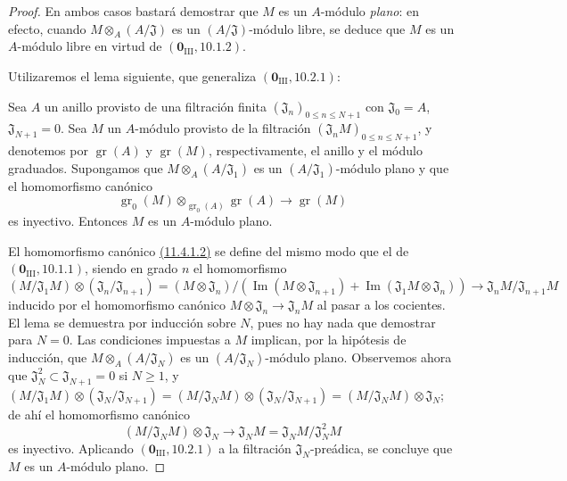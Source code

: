 \begin{proof}
En ambos casos bastará demostrar que $M$ es un $A$-módulo \emph{plano}: en efecto,
cuando $M\otimes_A(A/\mathfrak J)$ es un $(A/\mathfrak J)$-módulo libre, se deduce que $M$ es un $A$-módulo
libre en virtud de $(\mathbf 0_{\mathrm{III}},10.1.2)$.

Utilizaremos el lema siguiente, que generaliza $(\mathbf 0_{\mathrm{III}},10.2.1)$:

\begin{lemma}[11.4.1.1]
\label{IV.11.4.1.1}
Sea $A$ un anillo provisto de una filtración finita $(\mathfrak J_n)_{0\leq n\leq N+1}$ con
$\mathfrak J_0=A$, $\mathfrak J_{N+1}=0$. Sea $M$ un $A$-módulo provisto de la filtración $(\mathfrak J_nM)_{0\leq n\leq N+1}$, y denotemos
por $\operatorname{gr}(A)$ y $\operatorname{gr}(M)$, respectivamente, el anillo y el módulo graduados. Supongamos que $M\otimes_A(A/\mathfrak J_1)$
es un $(A/\mathfrak J_1)$-módulo plano y que el homomorfismo canónico
\begin{equation}
\operatorname{gr}_0(M)\otimes_{\operatorname{gr}_0(A)}\operatorname{gr}(A)
\longrightarrow\operatorname{gr}(M)
\label{IV.11.4.1.2-fr}
\tag{11.4.1.2}
\end{equation}
es inyectivo. Entonces $M$ es un $A$-módulo plano.
\end{lemma}

El homomorfismo canónico {\hyperlink{ega4.c04.lem.11-4-1-2}{(11.4.1.2)}} se define del mismo modo que
el de $(\mathbf 0_{\mathrm{III}},10.1.1)$, siendo en grado $n$ el homomorfismo
\[
(M/\mathfrak J_1M)\otimes(\mathfrak J_n/\mathfrak J_{n+1})
=(M\otimes\mathfrak J_n)/
(\operatorname{Im}(M\otimes\mathfrak J_{n+1})
+\operatorname{Im}(\mathfrak J_1M\otimes\mathfrak J_n))
\longrightarrow\mathfrak J_nM/\mathfrak J_{n+1}M
\]
inducido por el homomorfismo canónico $M\otimes\mathfrak J_n\to\mathfrak J_nM$ al pasar a los cocientes.
El lema se demuestra por inducción sobre $N$, pues no hay nada que demostrar para $N=0$.
Las condiciones impuestas a $M$ implican, por la hipótesis de inducción, que $M\otimes_A(A/\mathfrak J_N)$
es un $(A/\mathfrak J_N)$-módulo plano. Observemos ahora que $\mathfrak J_N^2\subset\mathfrak J_{N+1}=0$ si $N\geq1$, y
$(M/\mathfrak J_1M)\otimes(\mathfrak J_N/\mathfrak J_{N+1})
=(M/\mathfrak J_NM)\otimes(\mathfrak J_N/\mathfrak J_{N+1})
=(M/\mathfrak J_NM)\otimes\mathfrak J_N$; de ahí el homomorfismo canónico
\[
(M/\mathfrak J_NM)\otimes\mathfrak J_N
\longrightarrow\mathfrak J_NM=\mathfrak J_NM/\mathfrak J_N^2M
\]
es inyectivo. Aplicando $(\mathbf 0_{\mathrm{III}},10.2.1)$ a la filtración $\mathfrak J_N$-preádica, se concluye que
$M$ es un $A$-módulo plano.


\end{proof}
